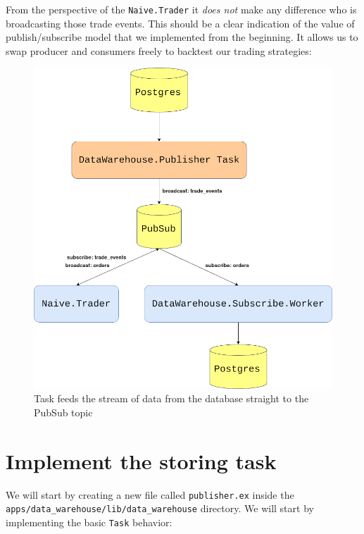\documentclass[
]{book}
\begin{document}
From the perspective of the \texttt{Naive.Trader} it \emph{does not} make any difference who is broadcasting those trade events. This should be a clear indication of the value of publish/subscribe model that we implemented from the beginning. It allows us to swap producer and consumers freely to backtest our trading strategies:

\begin{figure}
\centering
\includegraphics{images/chapter_14_03_backtest_pubsub.png}
\caption{Task feeds the stream of data from the database straight to the PubSub topic}
\end{figure}

\hypertarget{implement-the-storing-task}{%
\section{Implement the storing task}\label{implement-the-storing-task}}

We will start by creating a new file called \texttt{publisher.ex} inside the \texttt{apps/data\_warehouse/lib/data\_warehouse} directory. We will start by implementing the basic \texttt{Task} behavior:
\end{document}
